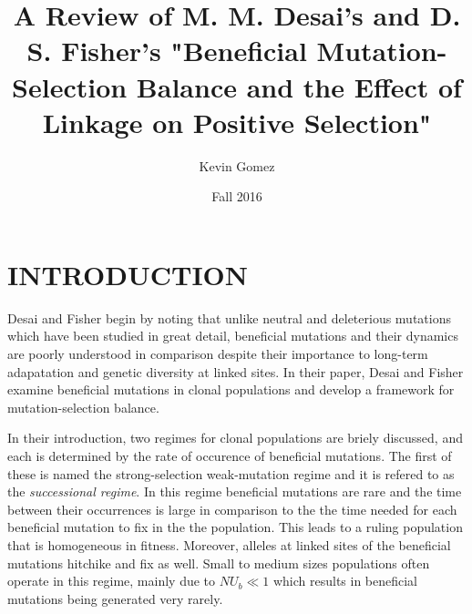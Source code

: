 \documentclass[12pt,2 column]{article}
\title{A Review of M. M. Desai's and D. S. Fisher's "Beneficial Mutation-Selection Balance and the Effect of Linkage on Positive Selection"}
\date{Fall 2016}
\author{Kevin Gomez}
\begin{document}
\maketitle
\newpage

%


\section*{INTRODUCTION}
Desai and Fisher \cite{DesFish07} begin by noting that unlike neutral and deleterious mutations which have been studied in great detail, beneficial mutations and their dynamics are poorly understood in comparison despite their importance to long-term adapatation and genetic diversity at linked sites.  In their paper, Desai and Fisher examine beneficial mutations in clonal populations and develop a framework for mutation-selection balance.  

In their introduction, two regimes for clonal populations are briely discussed, and each is determined by the rate of occurence of beneficial mutations.  The first of these is named the strong-selection weak-mutation regime and it is refered to as the \textit{successional regime}.  In this regime beneficial mutations are rare and the time between their occurrences is large in comparison to the the time needed for each beneficial mutation to fix in the the population.  This leads to a ruling population that is homogeneous in fitness. Moreover, alleles at linked sites of the beneficial mutations hitchike and fix as well.  Small to medium sizes populations often operate in this regime, mainly due to $NU_b \ll 1$ which results in beneficial mutations being generated very rarely. 
\end{document}
